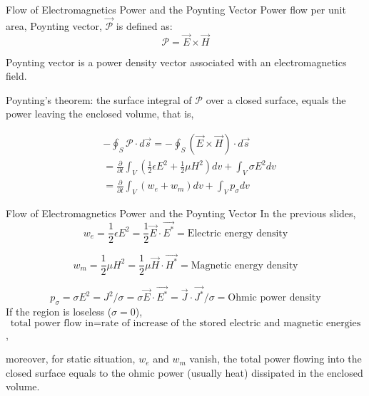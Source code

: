 \documentclass[xcolor={dvipsnames}]{beamer}
\begin{document}
\begin{frame}{Flow of Electromagnetics Power and the Poynting Vector}
Power flow per unit area, Poynting vector, $\vec{\mathcal{P}}$ is defined as:
$$
\mathcal{P} = \vec{E}\times\vec{H}
$$

Poynting vector is a power density vector associated with an electromagnetics field. 

Poynting's theorem: the surface integral of $\mathcal{P}$ over a closed surface, equals the power leaving the enclosed volume, that is,

$$
\begin{aligned}
    &-\oint_S\mathcal{P}\cdot d\vec{s} = - \oint_S(\vec{E}\times\vec{H})\cdot d\vec{s} \\
    &= \frac{\partial}{\partial t} \int_V\left(\frac{1}{2}\epsilon E^2 + \frac{1}{2} \mu H^2\right) dv + \int_V \sigma E^2 dv\\
    & = \frac{\partial}{\partial t}\int_V(w_e + w_m)dv + \int_V p_\sigma dv
\end{aligned}
$$
\end{frame}
\begin{frame}{Flow of Electromagnetics Power and the Poynting Vector}
In the previous slides,
$$
w_e = \frac{1}{2}\epsilon E^2 = \frac{1}{2}\vec{E}\cdot\vec{E^*} = \text{Electric energy density}
$$

$$
w_m = \frac{1}{2}\mu H^2 = \frac{1}{2}\mu \vec{H}\cdot\vec{H^*} = \text{Magnetic energy density}
$$

$$
p_\sigma = \sigma E^2 = J^2/\sigma = \sigma \vec{E}\cdot\vec{E^*} = \vec{J}\cdot\vec{J^*}/\sigma = \text{Ohmic power density}
$$
If the region is loseless ($\sigma = 0$), 
$$
\text{total power flow in} = \text{rate of increase of the stored electric and magnetic energies}
$$,

moreover, for static situation, $w_e$ and $w_m$ vanish, the total power flowing into the closed surface equals to the ohmic power (usually heat) dissipated in the enclosed volume.

\end{frame}
\end{document}
